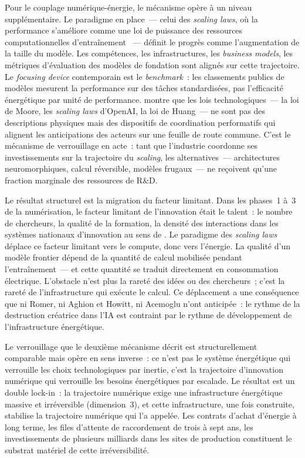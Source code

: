 Pour le couplage numérique-énergie, le mécanisme opère à un niveau supplémentaire. Le paradigme en place~--- celui des \emph{scaling laws}, où la performance s'améliore comme une loi de puissance des ressources computationnelles d'entraînement \parencite{kaplan_scaling_2020}~--- définit le progrès comme l'augmentation de la taille du modèle. Les compétences, les infrastructures, les \emph{business models}, les métriques d'évaluation des modèles de fondation sont alignés sur cette trajectoire. Le \emph{focusing device} contemporain est le \emph{benchmark}~: les classements publics de modèles mesurent la performance sur des tâches standardisées, pas l'efficacité énergétique par unité de performance. \textcite{roussilhe_phase_2025} montre que les \og lois\fg{} technologiques~--- la loi de Moore, les \emph{scaling laws} d'OpenAI, la \og loi de Huang\fg{}~--- ne sont pas des descriptions physiques mais des dispositifs de coordination performatifs qui alignent les anticipations des acteurs sur une feuille de route commune. C'est le mécanisme de verrouillage en acte~: tant que l'industrie coordonne ses investissements sur la trajectoire du \emph{scaling}, les alternatives~--- architectures neuromorphiques, calcul réversible, modèles frugaux~--- ne reçoivent qu'une fraction marginale des ressources de R\&D.

Le résultat structurel est la migration du facteur limitant. Dans les phases~1 à~3 de la numérisation, le facteur limitant de l'innovation était le talent~: le nombre de chercheurs, la qualité de la formation, la densité des interactions dans les systèmes nationaux d'innovation au sens de \textcite{lundvall_national_1992}. Le paradigme des \emph{scaling laws} déplace ce facteur limitant vers le compute, donc vers l'énergie. La qualité d'un modèle frontier dépend de la quantité de calcul mobilisée pendant l'entraînement~--- et cette quantité se traduit directement en consommation électrique. L'obstacle n'est plus la rareté des idées ou des chercheurs~; c'est la rareté de l'infrastructure qui exécute le calcul. Ce déplacement a une conséquence que ni Romer, ni Aghion et Howitt, ni Acemoglu n'ont anticipée~: le rythme de la destruction créatrice dans l'IA est contraint par le rythme de développement de l'infrastructure énergétique.

 Le verrouillage que le deuxième mécanisme décrit est structurellement comparable mais opère en sens inverse~: ce n'est pas le système énergétique qui verrouille les choix technologiques par inertie, c'est la trajectoire d'innovation numérique qui verrouille les besoins énergétiques par escalade. Le résultat est un double lock-in~: la trajectoire numérique exige une infrastructure énergétique massive et irréversible (dimension~3), et cette infrastructure, une fois construite, stabilise la trajectoire numérique qui l'a appelée. Les contrats d'achat d'énergie à long terme, les files d'attente de raccordement de trois à sept ans, les investissements de plusieurs milliards dans les sites de production constituent le substrat matériel de cette irréversibilité.

